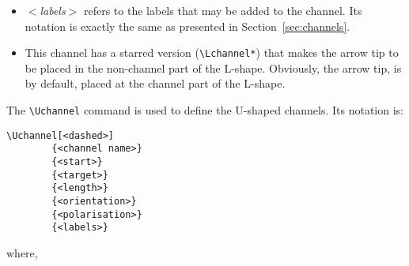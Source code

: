 \documentclass[11pt]{article}
\begin{document}
\begin{itemize}
\item \emph{$<$labels$>$} refers to the labels that may be added to the channel. Its notation is exactly the same as presented in Section~\ref{sec:channels}.

\item This channel has a starred version (\verb+\Lchannel*+) that makes the arrow tip to be placed in the non-channel part of the L-shape. Obviously, the arrow tip, is by default, placed at the channel part of the L-shape.

\end{itemize}



The \verb+\Uchannel+ command is used to define the U-shaped channels. Its notation is:

\begin{verbatim}
\Uchannel[<dashed>]
        {<channel name>}
        {<start>}
        {<target>}
        {<length>}
        {<orientation>}
        {<polarisation>}
        {<labels>}
\end{verbatim}

where,
\end{document}

